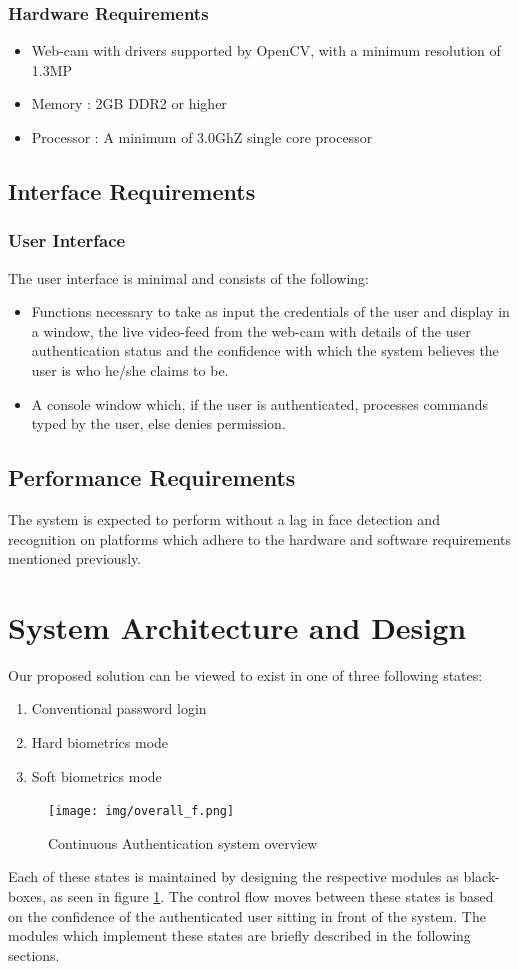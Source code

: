 \documentclass[12pt]{article}			%
\begin{document}
\subsubsection{ Hardware Requirements }
\begin{itemize}
\item Web-cam with drivers supported by OpenCV, with a minimum resolution of 1.3MP
\item Memory : 2GB DDR2 or higher
\item Processor : A minimum of 3.0GhZ single core processor
\end{itemize}

\subsection{ Interface Requirements }
\subsubsection{ User Interface }
The user interface is minimal and consists of the following:
\begin{itemize}
\item Functions necessary to take as input the credentials of the user and display in a window, the live video-feed from the web-cam with details of the user authentication status and the confidence with which the system believes the user is who he/she claims to be.
\item A console window which, if the user is authenticated, processes commands typed by the user, else denies permission. 
\end{itemize}
  
\subsection{ Performance Requirements }
The system is expected to perform without a lag in face detection and recognition on platforms which adhere to the hardware and software requirements mentioned previously.

\section{ System Architecture and Design }  
Our proposed solution can be viewed to exist in one of three following states:
\begin{enumerate}
	\item Conventional password login
	\item Hard biometrics mode
	\item Soft biometrics mode
\end{enumerate}
\begin{figure}[h!]
	\centering
	\texttt{[image: img/overall\_f.png]}
	\caption{Continuous Authentication system overview}
	\label{fig:ca_overview}
\end{figure}
Each of these states is maintained by designing the respective modules as black-boxes, as seen in figure \ref{fig:ca_overview}.
The control flow moves between these states is based on the confidence of the authenticated user sitting in front of the system.
The modules which implement these states are briefly described in the following sections.
\end{document}
